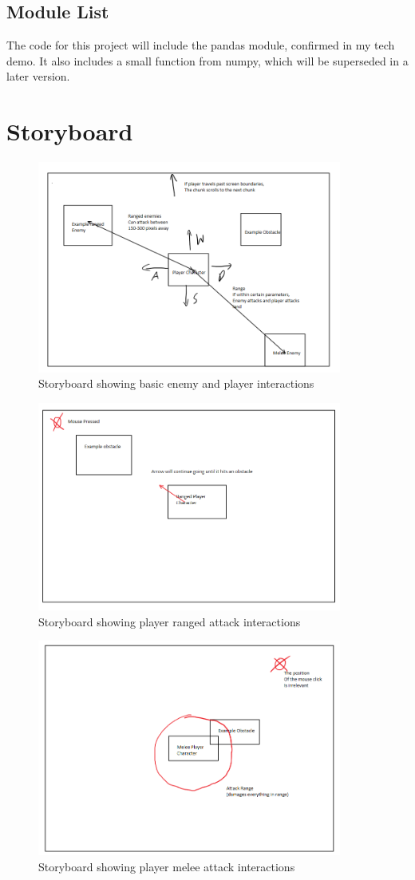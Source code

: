 \documentclass[12pt]{article}
\begin{document}
\subsection{Module List}
The code for this project will include the pandas module, confirmed in 
my tech demo. It also includes a small function from numpy, which will
be superseded in a later version. 
\newpage
\section{Storyboard}
\begin{figure}[h]
    \centering
    \includegraphics[width = 10cm]{Storyboard0.PNG}
    \caption{Storyboard showing basic enemy and player interactions}
\end{figure}
\begin{figure}[h]
    \centering
    \includegraphics[width = 10cm]{Storyboard1.PNG}
    \caption{Storyboard showing player ranged attack interactions}
\end{figure}
\begin{figure}[h]
    \centering
    \includegraphics[width = 10cm]{Storyboard2.PNG}
    \caption{Storyboard showing player melee attack interactions}
\end{figure}
\end{document}
